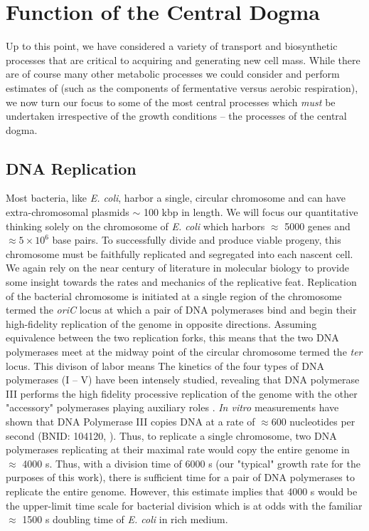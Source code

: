 \section{Function of the Central Dogma}
Up to this point, we have considered a variety of transport and biosynthetic
processes that are critical to acquiring and generating new cell mass. While
there are of course many other metabolic processes we could consider and
perform estimates of (such as the components of fermentative versus aerobic
respiration), we now turn our focus to some of the most central processes
which \textit{must} be undertaken irrespective of the growth conditions --
the processes of the central dogma.

\subsection{DNA Replication}
Most bacteria, like \textit{E. coli}, harbor a single,
circular chromosome and can have extra-chromosomal plasmids $\sim$ 100 kbp in
length. We will focus our quantitative thinking solely on the chromosome of
\textit{E. coli} which harbors $\approx$ 5000 genes and $\approx 5\times
10^6$ base pairs. To successfully divide and produce viable progeny, this chromosome must be faithfully replicated and
segregated into each nascent cell. We again rely on the
near century of literature in molecular biology to provide some insight
towards the rates and mechanics of the replicative feat. Replication of the
bacterial chromosome is initiated at a single region of the chromosome termed
the \textit{oriC} locus at which a pair of DNA polymerases bind and begin
their high-fidelity replication of the genome in opposite directions.
Assuming equivalence between the two replication forks, this means that the
two DNA polymerases meet at the midway point of the circular chromosome
termed the \textit{ter} locus. This divison of labor means The kinetics of
the four types of DNA polymerases (I -- V) have been intensely studied,
revealing that DNA polymerase III performs the high fidelity processive
replication of the genome with the other "accessory" polymerases playing
auxiliary roles \cite{fijalkowska2012}. \textit{In vitro} measurements have
shown that DNA Polymerase III copies DNA at a rate of $\approx 600$
nucleotides per second (BNID: 104120, \cite{milo2010}). Thus, to replicate a
single chromosome, two DNA polymerases replicating at their maximal rate would
copy the entire genome in $\approx$ 4000 s. Thus, with a division time of 6000
s (our "typical" growth rate for the purposes of this work), there is sufficient
time for a pair of DNA polymerases to replicate the entire genome.  However, this
estimate implies that 4000 s would be the upper-limit time scale for bacterial
division which is at odds with the familiar $\approx$ 1500 s doubling time of
\textit{E. coli} in rich medium.

